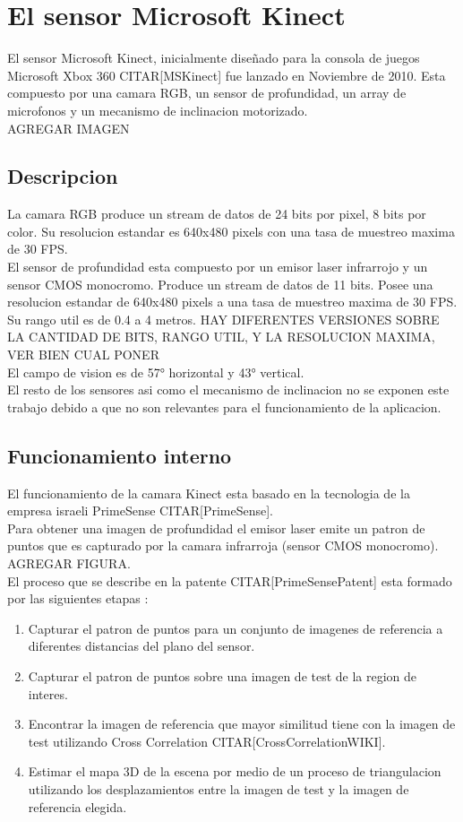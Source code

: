 
\chapter{El sensor Microsoft Kinect}
El sensor Microsoft Kinect, inicialmente dise\~{n}ado para la consola de juegos Microsoft Xbox 360 CITAR[MSKinect] fue lanzado en Noviembre de 2010.
Esta compuesto por una camara RGB, un sensor de profundidad, un array de microfonos y un mecanismo de inclinacion motorizado.
\\
AGREGAR IMAGEN

\section{Descripcion}
\label{S:descripcion-kinect}
La camara RGB produce un stream de datos de 24 bits por pixel, 8 bits por color. Su resolucion estandar es 640x480 pixels con una tasa de muestreo maxima de 30 FPS. \\
El sensor de profundidad esta compuesto por un emisor laser infrarrojo y un sensor CMOS monocromo. Produce un stream de datos de 11 bits. Posee una resolucion estandar de 640x480 pixels a una tasa de muestreo maxima de 30 FPS. Su rango util es de 0.4 a 4 metros. HAY DIFERENTES VERSIONES SOBRE LA CANTIDAD DE BITS, RANGO UTIL,  Y LA RESOLUCION MAXIMA, VER BIEN CUAL PONER \\
El campo de vision es de 57° horizontal y 43° vertical. \\
El resto de los sensores asi como el mecanismo de inclinacion no se exponen este trabajo debido a que no son relevantes para el funcionamiento de la aplicacion.

\section{Funcionamiento interno}
\label{S:funcionamiento-kinect}

El funcionamiento de la camara Kinect esta basado en la tecnologia de la empresa israeli PrimeSense CITAR[PrimeSense]. \\
Para obtener una imagen de profundidad el emisor laser emite un patron de puntos que es capturado por la camara infrarroja (sensor CMOS monocromo). AGREGAR FIGURA. \\
El proceso que se describe en la patente CITAR[PrimeSensePatent] esta formado por las siguientes etapas :
\begin{enumerate}
\item Capturar el patron de puntos para un conjunto de imagenes de referencia a diferentes distancias del plano del sensor.
\item Capturar el patron de puntos sobre una imagen de test de la region de interes.
\item Encontrar la imagen de referencia que mayor similitud tiene con la imagen de test utilizando Cross Correlation CITAR[CrossCorrelationWIKI].
\item Estimar el mapa 3D de la escena por medio de un proceso de triangulacion utilizando los desplazamientos entre la imagen de test y la imagen de referencia elegida. 
\end{enumerate}

